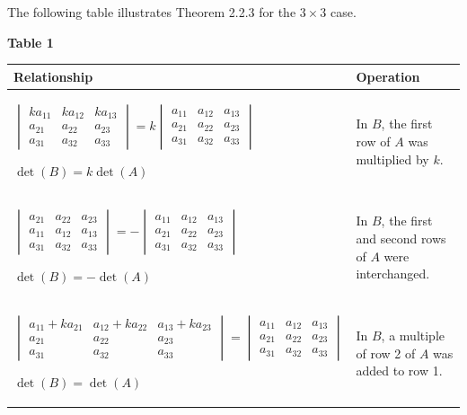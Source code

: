 \documentclass{article}
\theoremstyle{mystyle}
\begin{document}
The following table illustrates Theorem 2.2.3 for the $3\times3$ case.

\vspace{2mm}
\noindent\textbf{Table 1}
\vspace{1mm}

\begin{center}
\renewcommand{\arraystretch}{2.2}
\begin{tabular}{|p{8.5cm}|p{5cm}|}
\hline
\textbf{Relationship} & \textbf{Operation} \\
\hline
$\begin{vmatrix}ka_{11}&ka_{12}&ka_{13}\\a_{21}&a_{22}&a_{23}\\a_{31}&a_{32}&a_{33}\end{vmatrix}
=k\begin{vmatrix}a_{11}&a_{12}&a_{13}\\a_{21}&a_{22}&a_{23}\\a_{31}&a_{32}&a_{33}\end{vmatrix}$

$\det(B)=k\det(A)$
&
In $B$, the first row of $A$ was multiplied by $k$. \\
\hline
$\begin{vmatrix}a_{21}&a_{22}&a_{23}\\a_{11}&a_{12}&a_{13}\\a_{31}&a_{32}&a_{33}\end{vmatrix}
=-\begin{vmatrix}a_{11}&a_{12}&a_{13}\\a_{21}&a_{22}&a_{23}\\a_{31}&a_{32}&a_{33}\end{vmatrix}$

$\det(B)=-\det(A)$
&
In $B$, the first and second rows of $A$ were interchanged. \\
\hline
$\begin{vmatrix}a_{11}+ka_{21}&a_{12}+ka_{22}&a_{13}+ka_{23}\\a_{21}&a_{22}&a_{23}\\a_{31}&a_{32}&a_{33}\end{vmatrix}
=\begin{vmatrix}a_{11}&a_{12}&a_{13}\\a_{21}&a_{22}&a_{23}\\a_{31}&a_{32}&a_{33}\end{vmatrix}$

$\det(B)=\det(A)$
&
In $B$, a multiple of row 2 of $A$ was added to row 1. \\
\hline
\end{tabular}
\end{center}
\end{document}
